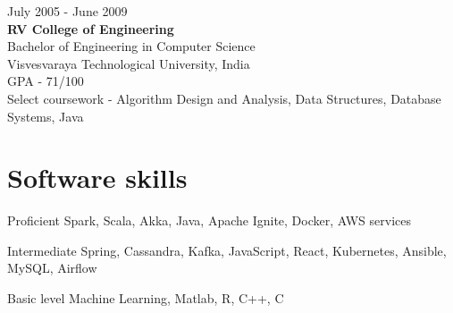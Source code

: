 \documentclass{tccv}
\begin{document}
{\hfill\sc July 2005 - June 2009}\\
\textbf{RV College of Engineering}\\
Bachelor of Engineering in Computer Science\\
Visvesvaraya Technological University, India\\
GPA - 71/100\\
Select coursework - Algorithm Design and Analysis, Data Structures, Database Systems, Java\\ 


\vspace{-0.2in}
\section{Software skills}
\begin{factlist}
\item{Proficient}
     {Spark, Scala, Akka, Java, Apache Ignite, Docker, AWS services}

\item{Intermediate}
     {Spring, Cassandra, Kafka, JavaScript, React, Kubernetes, Ansible, MySQL, Airflow}

\item{Basic level}
     {Machine Learning, Matlab, R, C++, C}
\end{factlist}
\end{document}
